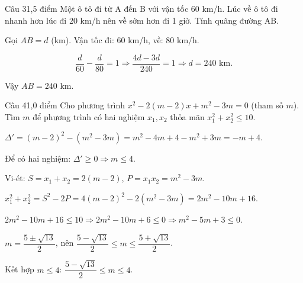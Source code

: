 \begin{de_cau}{Câu 3}{1,5 điểm}
Một ô tô đi từ A đến B với vận tốc 60 km/h. Lúc về ô tô đi nhanh hơn lúc đi 20 km/h nên về sớm hơn
đi 1 giờ. Tính quãng đường AB.
\end{de_cau}

\begin{loi_giai_cau}
Gọi $AB = d$ (km). Vận tốc đi: 60 km/h, về: 80 km/h.

\[\frac{d}{60}-\frac{d}{80}=1\Rightarrow\frac{4d-3d}{240}=1\Rightarrow d=240\text{ km}.\]

Vậy $AB = \boxed{240}$ km.
\end{loi_giai_cau}

\begin{de_cau}{Câu 4}{1,0 điểm}
Cho phương trình $x^2-2(m-2)x+m^2-3m=0$ (tham số $m$). Tìm $m$ để phương trình có hai nghiệm
$x_1, x_2$ thỏa mãn $x_1^2+x_2^2\leq 10$.
\end{de_cau}

\begin{loi_giai_cau}
$\Delta'=(m-2)^2-(m^2-3m) = m^2-4m+4-m^2+3m = -m+4$.

Để có hai nghiệm: $\Delta'\geq 0\Rightarrow m\leq 4$.

Vi-ét: $S=x_1+x_2=2(m-2)$, $P=x_1x_2=m^2-3m$.

$x_1^2+x_2^2=S^2-2P=4(m-2)^2-2(m^2-3m)=2m^2-10m+16$.

$2m^2-10m+16\leq 10\Rightarrow 2m^2-10m+6\leq 0\Rightarrow m^2-5m+3\leq 0$.

$m=\dfrac{5\pm\sqrt{13}}{2}$, nên $\dfrac{5-\sqrt{13}}{2}\leq m\leq \dfrac{5+\sqrt{13}}{2}$.

Kết hợp $m\leq 4$: $\boxed{\dfrac{5-\sqrt{13}}{2}\leq m\leq 4}$.
\end{loi_giai_cau}
